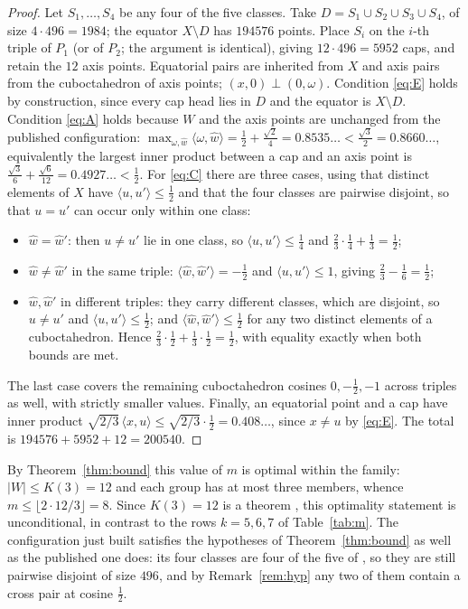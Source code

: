 \documentclass[11pt]{amsart}
\theoremstyle{remark}
\newcommand{\ip}[2]{\langle #1,#2\rangle}
\newcommand{\wh}{\widehat{w}}
\begin{document}
\begin{proof}
Let $S_1,\dots,S_4$ be any four of the five classes. Take
$D=S_1\cup S_2\cup S_3\cup S_4$, of size $4\cdot496=1984$; the equator
$X\setminus D$ has $194576$ points. Place $S_i$ on the $i$-th triple of $P_1$
(or of $P_2$; the argument is identical), giving $12\cdot496=5952$ caps, and
retain the $12$ axis points. Equatorial
pairs are inherited from $X$ and axis pairs from the cuboctahedron of axis
points; $(x,0)\perp(0,\omega)$. Condition \eqref{eq:E} holds by construction,
since every cap head lies in $D$ and the equator is $X\setminus D$. Condition
\eqref{eq:A} holds because $W$ and the axis points are unchanged from the
published configuration:
$\max_{\omega,\wh}\ip{\omega}{\wh}=\tfrac12+\tfrac{\sqrt2}{4}=0.8535\ldots
<\tfrac{\sqrt3}{2}=0.8660\ldots$, equivalently the largest inner product between
a cap and an axis point is
$\tfrac{\sqrt3}{6}+\tfrac{\sqrt6}{12}=0.4927\ldots<\tfrac12$. For \eqref{eq:C}
there are three cases, using that distinct elements of $X$ have
$\ip{u}{u'}\le\tfrac12$ and that the four classes are pairwise disjoint, so that
$u=u'$ can occur only within one class:
\begin{itemize}
\item $\wh=\wh{}'$: then $u\ne u'$ lie in one class, so $\ip{u}{u'}\le\tfrac14$
      and $\tfrac23\cdot\tfrac14+\tfrac13=\tfrac12$;
\item $\wh\ne\wh{}'$ in the same triple: $\ip{\wh}{\wh{}'}=-\tfrac12$ and
      $\ip{u}{u'}\le1$, giving $\tfrac23-\tfrac16=\tfrac12$;
\item $\wh,\wh{}'$ in different triples: they carry different classes, which are
      disjoint, so $u\ne u'$ and $\ip{u}{u'}\le\tfrac12$; and
      $\ip{\wh}{\wh{}'}\le\tfrac12$ for any two distinct elements of a
      cuboctahedron. Hence
      $\tfrac23\cdot\tfrac12+\tfrac13\cdot\tfrac12=\tfrac12$, with equality
      exactly when both bounds are met.
\end{itemize}
The last case covers the remaining cuboctahedron cosines $0,-\tfrac12,-1$ across
triples as well, with strictly smaller values. Finally, an equatorial point and
a cap have inner product $\sqrt{2/3}\,\ip{x}{u}\le\sqrt{2/3}\cdot\tfrac12
=0.408\ldots$, since $x\ne u$ by \eqref{eq:E}. The total is
$194576+5952+12=200540$.
\end{proof}

By Theorem~\ref{thm:bound} this value of $m$ is optimal within the family:
$|W|\le K(3)=12$ and each group has at most three members, whence
$m\le\lfloor 2\cdot12/3\rfloor=8$. Since $K(3)=12$ is a theorem
\cite{svdw,cs}, this optimality statement is unconditional, in contrast to the
rows $k=5,6,7$ of Table~\ref{tab:m}. The configuration just built satisfies the
hypotheses of Theorem~\ref{thm:bound} as well as the published one does: its
four classes are four of the five of \cite{ma2025}, so they are still pairwise
disjoint of size $496$, and by Remark~\ref{rem:hyp} any two of them contain a
cross pair at cosine $\tfrac12$.
\end{document}
